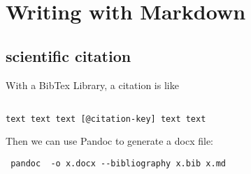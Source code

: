 \section{Writing with Markdown}

\subsection{scientific citation}

With a BibTex Library, a citation is like 
\begin{verbatim}

text text text [@citation-key] text text

\end{verbatim}

Then we can use Pandoc to generate a docx file:

\begin{verbatim}
 pandoc  -o x.docx --bibliography x.bib x.md
\end{verbatim}

